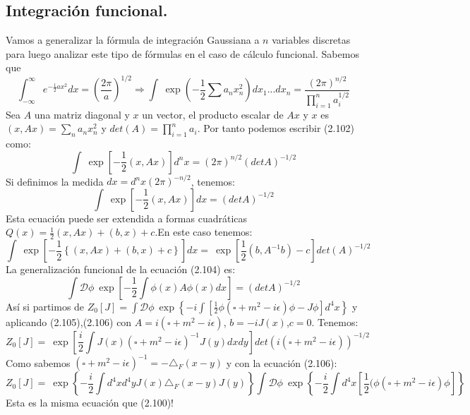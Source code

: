 \subsection{Integración funcional.}
Vamos a generalizar la fórmula de integración Gaussiana a $n$ variables discretas para luego analizar este tipo de fórmulas en el caso de cálculo funcional. Sabemos que 
\begin{equation}
\int_{-\infty}^{\infty}e^{-\frac{1}{2}ax^{2}}dx=\left(\frac{2\pi}{a}\right)^{1/2}\Rightarrow\int\ \exp\left(-\frac{1}{2}\sum a_{n}x_{n}^{2}\right)dx_{1}...dx_{n}=\frac{(2\pi)^{n/2}}{\prod_{i=1}^{n}a_{i}^{1/2}}
\end{equation}
Sea $A$ una matriz diagonal y $x$ un vector, el producto escalar de $Ax$ y $x$ es $(x,Ax)=\sum_n a_nx_{n}^{2}$ y $det(A)=\prod_{i=1}^{n}a_i$. Por tanto podemos escribir (2.102) como:
\begin{equation}
\int\ \exp\left[-\frac{1}{2}(x,Ax)\right]d^{n}x=(2\pi)^{n/2}(detA)^{-1/2}
\end{equation}
Si definimos la medida $dx=d^nx(2\pi)^{-n/2}$, tenemos:
\begin{equation}
\int\ \exp\left[-\frac{1}{2}(x,Ax)\right]dx=(detA)^{-1/2}
\end{equation}
Esta ecuación puede ser extendida a formas cuadráticas $Q(x)=\frac{1}{2}(x,Ax)+(b,x)+c$.En este caso tenemos:
\begin{equation}
\int\ \exp\left[-\frac{1}{2}\left\{ (x,Ax)+(b,x)+c\right\} \right]dx=\ \exp\left[\frac{1}{2}(b,A^{-1}b)-c\right]det(A)^{-1/2}
\end{equation}
La generalización funcional de la ecuación (2.104) es:
\begin{equation}
\int\mathcal{D}\phi\ \exp\left[-\frac{1}{2}\int\phi(x)A\phi(x)dx\right]=(detA)^{-1/2}
\end{equation}
Así si partimos de $Z_{0}[J]=\int\mathcal{D}\phi\ \exp\left\{ -i\int\left[\frac{1}{2}\phi(\square+m^{2}-i\epsilon)\phi-J\phi\right]d^{4}x\right\} $ y aplicando (2.105),(2.106) con $A=i(\square+m^2-i\epsilon)$, $b=-iJ(x)$,$c=0$. Tenemos:
\begin{equation}
Z_{0}[J]=\ \exp\left[\frac{i}{2}\int J(x)(\square+m^{2}-i\epsilon)^{-1}J(y)dxdy\right]det(i(\square+m^{2}-i\epsilon))^{-1/2}
\end{equation}
Como sabemos $(\square +m^2-i\epsilon)^{-1}=-\triangle_F(x-y)$ y con la ecuación (2.106):
\begin{equation}
Z_0[J]=\ \exp\left\{ -\frac{i}{2}\int d^{4}xd^{4}yJ(x)\triangle_{F}(x-y)J(y)\right\} \int\mathcal{D}\phi\ \exp\left\{ -\frac{i}{2}\int d^{4}x\left[\frac{1}{2}(\phi(\square +m^{2}-i\epsilon)\phi\right]\right\} 
\end{equation}
Esta es la misma ecuación que (2.100)!

